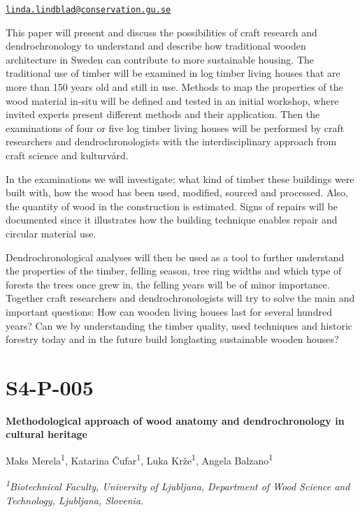 \documentclass[
]{book}
\begin{document}
\href{mailto:linda.lindblad@conservation.gu.se}{\nolinkurl{linda.lindblad@conservation.gu.se}}

This paper will present and discuss the possibilities of craft research and dendrochronology to understand and describe how traditional wooden architecture in Sweden can contribute to more sustainable housing. The traditional use of timber will be examined in log timber living houses that are more than 150 years old and still in use. Methods to map the properties of the wood material in-situ will be defined and tested in an initial workshop, where invited experts present different methods and their application. Then the examinations of four or five log timber living houses will be performed by craft researchers and dendrochronologists with the interdisciplinary approach from craft science and kulturvård.

In the examinations we will investigate; what kind of timber these buildings were built with, how the wood has been used, modified, sourced and processed. Also, the quantity of wood in the construction is estimated. Signs of repairs will be documented since it illustrates how the building technique enables repair and circular material use.

Dendrochronological analyses will then be used as a tool to further understand the properties of the timber, felling season, tree ring widths and which type of forests the trees once grew in, the felling years will be of minor importance. Together craft researchers and dendrochronologists will try to solve the main and important questions: How can wooden living houses last for several hundred years? Can we by understanding the timber quality, used techniques and historic forestry today and in the future build longlasting sustainable wooden houses?

\hypertarget{s4-p-005}{%
\section*{S4-P-005}\label{s4-p-005}}

\textbf{Methodological approach of wood anatomy and dendrochronology in cultural heritage}

Maks Merela\textsuperscript{1}, Katarina Čufar\textsuperscript{1}, Luka Krže\textsuperscript{1}, Angela Balzano\textsuperscript{1}

\emph{\textsuperscript{1}Biotechnical Faculty, University of Ljubljana, Department of Wood Science and Technology, Ljubljana, Slovenia.}
\end{document}
